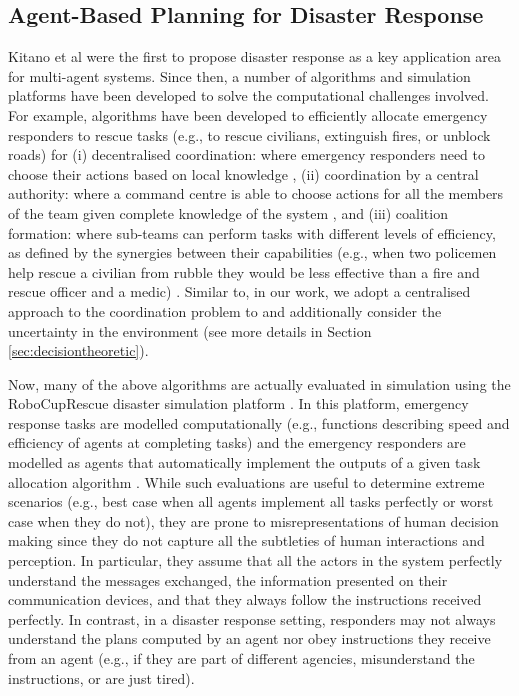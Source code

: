 \subsection{Agent-Based Planning for Disaster Response}\label{sec:agentsdisasters}
Kitano et al \cite{kitano:2001} were the first to propose disaster response as a key application area for multi-agent systems. Since then, a number of algorithms and simulation platforms have been developed to solve the computational challenges involved. For example, algorithms  have been developed to efficiently allocate emergency responders to rescue tasks (e.g., to rescue civilians, extinguish fires, or unblock roads) for (i) decentralised coordination: where emergency responders need to choose their actions based on local knowledge \cite{Chapman2009,puyol:etal:2014}, (ii)  coordination by a central authority: where a command centre is able to choose actions for all the members of the team given complete knowledge of the system \cite{koes2006constraint,Scerri2005,Khan-2011-JAAMAS}, and (iii) coalition formation: where sub-teams can perform tasks with different levels of efficiency, as defined by the synergies between their capabilities (e.g., when two policemen help rescue a civilian from rubble they would be less effective than a fire and rescue officer and a medic) \cite{ramchurn:etal:2010}.   Similar to\cite{koes2006constraint,Scerri2005,Khan-2011-JAAMAS}, in our work, we  adopt a centralised approach to the coordination problem to  and additionally consider the uncertainty in the environment (see more details in Section \ref{sec:decisiontheoretic}).

Now, many of the above algorithms are actually evaluated in simulation using the  Robo\-Cup\-Rescue disaster simulation platform \cite{skinner:ramchurn:2010}. In this platform, emergency response tasks are modelled computationally (e.g., functions describing speed and efficiency of agents at completing tasks) and the emergency responders are modelled as agents that automatically implement the outputs of a given task allocation algorithm \cite{kleiner:etal:2013,ramchurn:etal:2010}. While such evaluations are useful to determine extreme scenarios (e.g., best case when all agents implement all tasks perfectly or worst case when they do not), they are prone to misrepresentations of human decision making since they do not capture all the subtleties of human interactions and perception. In particular, they assume that all the actors in the system perfectly understand the messages exchanged, the information presented on their communication devices, and that they always follow the instructions received perfectly. In contrast, in a disaster response setting, responders may not  always understand the plans computed by an agent nor obey instructions they receive from an agent (e.g., if they are part of different agencies, misunderstand the instructions, or are just tired).

